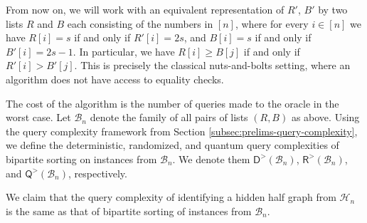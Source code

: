 \documentclass[11pt]{article}
\newcommand{\cB}{\mathcal{B}}
\newcommand{\cH}{\mathcal{H}}
\newcommand{\sD}{\mathsf{D}}
\newcommand{\sQ}{\mathsf{Q}}
\newcommand{\sR}{\mathsf{R}}
\begin{document}
From now on, we will work with an equivalent representation of $R'$, $B'$ by two lists $R$ and $B$ each consisting of the numbers in $[n]$, where for every $i \in [n]$ we have $R[i]=s$ if and only if $R'[i] = 2s$, and $B[i]=s$ if and only if $B'[i] = 2s-1$. In particular, we have $R[i] \geq B[j]$ if and only if $R'[i] > B'[j]$. This is precisely the classical nuts-and-bolts setting, where an algorithm does not have access to equality checks.

The cost of the algorithm is the number of queries made to the oracle in the worst case.
Let $\cB_n$ denote the family of all pairs of lists $(R,B)$ as above.
Using the query complexity framework from Section \ref{subsec:prelims-query-complexity},
we define the deterministic, randomized, and quantum query complexities of bipartite sorting on instances from $\cB_n$.
We denote them $\sD^{>}(\cB_n)$, $\sR^{>}(\cB_n)$, and $\sQ^{>}(\cB_n)$, respectively.

We claim that the query complexity of identifying a hidden half graph from $\cH_n$ is the same as that of bipartite sorting of instances from $\cB_n$.
\end{document}
